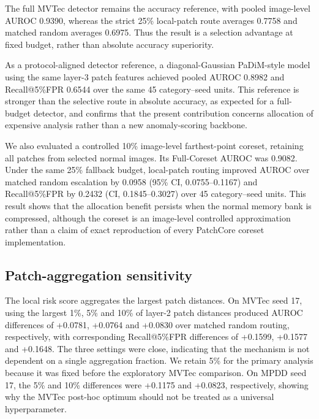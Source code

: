 \documentclass[preprint,12pt]{elsarticle}
\begin{document}
\begin{table}[t]
\centering
\caption{Local-patch route minus matched-random route at a strict 25\% fallback budget. Values are pooled paired differences over category--seed units.}
\label{tab:cross}
\end{table}

The full MVTec detector remains the accuracy reference, with pooled image-level AUROC 0.9390, whereas the strict 25\% local-patch route averages 0.7758 and matched random averages 0.6975. Thus the result is a selection advantage at fixed budget, rather than absolute accuracy superiority.

As a protocol-aligned detector reference, a diagonal-Gaussian PaDiM-style model using the same layer-3 patch features achieved pooled AUROC 0.8982 and Recall@5\%FPR 0.6544 over the same 45 category--seed units. This reference is stronger than the selective route in absolute accuracy, as expected for a full-budget detector, and confirms that the present contribution concerns allocation of expensive analysis rather than a new anomaly-scoring backbone.

We also evaluated a controlled 10\% image-level farthest-point coreset, retaining all patches from selected normal images. Its Full-Coreset AUROC was 0.9082. Under the same 25\% fallback budget, local-patch routing improved AUROC over matched random escalation by 0.0958 (95\% CI, 0.0755--0.1167) and Recall@5\%FPR by 0.2432 (CI, 0.1845--0.3027) over 45 category--seed units. This result shows that the allocation benefit persists when the normal memory bank is compressed, although the coreset is an image-level controlled approximation rather than a claim of exact reproduction of every PatchCore coreset implementation.

\subsection{Patch-aggregation sensitivity}
The local risk score aggregates the largest patch distances. On MVTec seed 17, using the largest 1\%, 5\% and 10\% of layer-2 patch distances produced AUROC differences of +0.0781, +0.0764 and +0.0830 over matched random routing, respectively, with corresponding Recall@5\%FPR differences of +0.1599, +0.1577 and +0.1648. The three settings were close, indicating that the mechanism is not dependent on a single aggregation fraction. We retain 5\% for the primary analysis because it was fixed before the exploratory MVTec comparison. On MPDD seed 17, the 5\% and 10\% differences were +0.1175 and +0.0823, respectively, showing why the MVTec post-hoc optimum should not be treated as a universal hyperparameter.
\end{document}
